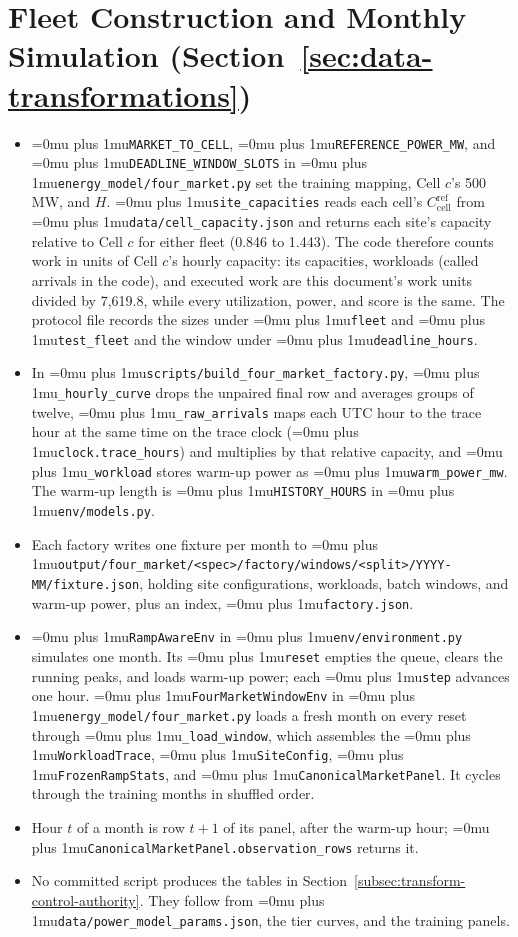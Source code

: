 \documentclass{UNCC-thesis}
\newcommand{\codepath}[1]{{\Urlmuskip=0mu plus 1mu\relax\nolinkurl{#1}}}
\begin{document}
\section{Fleet Construction and Monthly Simulation
    (Section~\ref{sec:data-transformations})}
\begin{itemize}
  \item \codepath{MARKET_TO_CELL}, \codepath{REFERENCE_POWER_MW}, and
        \codepath{DEADLINE_WINDOW_SLOTS} in
        \codepath{energy_model/four_market.py} set the training
        mapping, Cell \(c\)'s 500 MW, and \(H\). \codepath{site_capacities}
        reads each cell's \(C^{\mathrm{ref}}_{\mathrm{cell}}\) from
        \codepath{data/cell_capacity.json} and returns each site's capacity
        relative to Cell \(c\) for either fleet (0.846 to 1.443). The code
        therefore counts work in units of Cell \(c\)'s hourly capacity: its
        capacities, workloads (called arrivals in the code), and executed work are this document's work
        units divided by 7,619.8, while every utilization, power, and score
        is the same. The protocol file records the sizes
        under \codepath{fleet} and \codepath{test_fleet} and the window under
        \codepath{deadline_hours}.
  \item In \codepath{scripts/build_four_market_factory.py},
        \codepath{_hourly_curve} drops the unpaired final row and averages
        groups of twelve, \codepath{_raw_arrivals} maps each UTC hour to the
        trace hour at the same time on the trace clock
        (\codepath{clock.trace_hours}) and multiplies by
        that relative capacity, and \codepath{_workload}
        stores warm-up power as \codepath{warm_power_mw}. The warm-up length is
        \codepath{HISTORY_HOURS} in \codepath{env/models.py}.
  \item Each factory writes one fixture per month to
        \codepath{output/four_market/<spec>/factory/windows/<split>/YYYY-MM/fixture.json},
        holding site configurations, workloads, batch windows, and warm-up
        power, plus an index, \codepath{factory.json}.
  \item \codepath{RampAwareEnv} in \codepath{env/environment.py}
        simulates one month. Its \codepath{reset} empties the queue, clears the
        running peaks, and loads warm-up power; each \codepath{step} advances
        one hour. \codepath{FourMarketWindowEnv} in
        \codepath{energy_model/four_market.py} loads a fresh month on
        every reset through \codepath{_load_window}, which assembles the
        \codepath{WorkloadTrace}, \codepath{SiteConfig},
        \codepath{FrozenRampStats}, and \codepath{CanonicalMarketPanel}. It
        cycles through the training months in shuffled order.
  \item Hour \(t\) of a month is row \(t+1\) of its panel, after the warm-up
        hour; \codepath{CanonicalMarketPanel.observation_rows} returns it.
  \item No committed script produces the tables in
        Section~\ref{subsec:transform-control-authority}. They follow from
        \codepath{data/power_model_params.json}, the tier curves, and the
        training panels.
\end{itemize}
\end{document}
